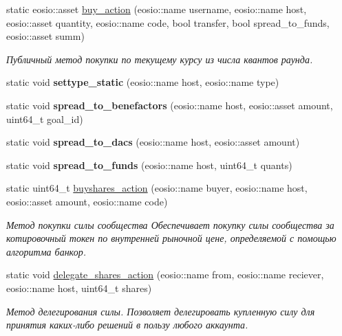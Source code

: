 \begin{DoxyCompactItemize}
static eosio\+::asset \mbox{\hyperlink{classeosio_1_1unicore_adfeb4fb3878a10d4acf6dc472566bc55}{buy\+\_\+action}} (eosio\+::name username, eosio\+::name host, eosio\+::asset quantity, eosio\+::name code, bool transfer, bool spread\+\_\+to\+\_\+funds, eosio\+::asset summ)
\begin{DoxyCompactList}\small\item\em Публичный метод покупки по текущему курсу из числа квантов раунда. \end{DoxyCompactList}\item 
\mbox{\label{classeosio_1_1unicore_a5d8ddfb04f14e1b90bc207d20f16e2ae}} 
static void {\bfseries settype\+\_\+static} (eosio\+::name host, eosio\+::name type)
\item 
\mbox{\label{classeosio_1_1unicore_a26f7df861487d0d3b018376b9b3fea9d}} 
static void {\bfseries spread\+\_\+to\+\_\+benefactors} (eosio\+::name host, eosio\+::asset amount, uint64\+\_\+t goal\+\_\+id)
\item 
\mbox{\label{classeosio_1_1unicore_a2982652beebd5b83055f71b303a49acb}} 
static void {\bfseries spread\+\_\+to\+\_\+dacs} (eosio\+::name host, eosio\+::asset amount)
\item 
\mbox{\label{classeosio_1_1unicore_a34e59d6ad061725584e12a0f11bcd713}} 
static void {\bfseries spread\+\_\+to\+\_\+funds} (eosio\+::name host, uint64\+\_\+t quants)
\item 
static uint64\+\_\+t \mbox{\hyperlink{classeosio_1_1unicore_a4e744b6a55f783f4f70a9d43a23daf98}{buyshares\+\_\+action}} (eosio\+::name buyer, eosio\+::name host, eosio\+::asset amount, eosio\+::name code)
\begin{DoxyCompactList}\small\item\em Метод покупки силы сообщества Обеспечивает покупку силы сообщества за котировочный токен по внутренней рыночной цене, определяемой с помощью алгоритма банкор. \end{DoxyCompactList}\item 
static void \mbox{\hyperlink{classeosio_1_1unicore_a911405ecb8c408e127196c9b27401f9f}{delegate\+\_\+shares\+\_\+action}} (eosio\+::name from, eosio\+::name reciever, eosio\+::name host, uint64\+\_\+t shares)
\begin{DoxyCompactList}\small\item\em Метод делегирования силы. Позволяет делегировать купленную силу для принятия каких-\/либо решений в пользу любого аккаунта. \end{DoxyCompactList}\item 

\end{DoxyCompactItemize}
